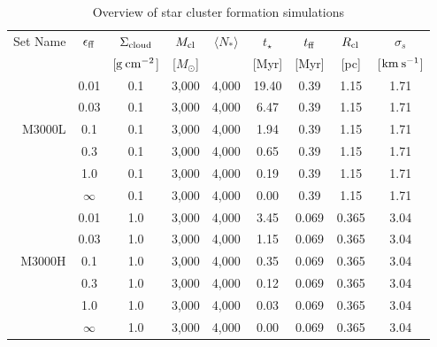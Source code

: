 \documentclass[fleqn,usenatbib]{mnras}
\newcommand\sfeff{\ensuremath{\epsilon_{\rm ff}}\xspace}   %
\newcommand\Sigmacloud{\ensuremath{\Sigma_{\rm cloud}}\xspace} %
\newcommand\Mcl{\ensuremath{M_{\rm cl}}\xspace} %
\begin{document}
\begin{table}
\centering
\caption{Overview of star cluster formation simulations}
\label{tab:simulations}
\begin{tabular}{rcccccccc}
Set Name & \sfeff & \Sigmacloud & \Mcl & $\langle N_* \rangle$ & $t_{\star}$ & $t_{\rm ff}$ & $R_{\rm cl}$ & $\sigma_{s}$\\ 
& & [$\rm g\:cm^{-2}$] & [$M_\odot$]  &   & [Myr] & [Myr] & [pc] & [$\rm km\: s^{-1}$] \\ \hline

  & 0.01 & 0.1 & 3,000  & 4,000  & 19.40 & 0.39  & 1.15 & 1.71 \\
  & 0.03 & 0.1 & 3,000  & 4,000  & 6.47  & 0.39  & 1.15 & 1.71 \\
M3000L  & 0.1  & 0.1 & 3,000  & 4,000  & 1.94  & 0.39  & 1.15 & 1.71 \\
  & 0.3  & 0.1 & 3,000  & 4,000  & 0.65  & 0.39  & 1.15 & 1.71 \\
  & 1.0  & 0.1 & 3,000  & 4,000  & 0.19  & 0.39  & 1.15 & 1.71 \\
  & $\infty$ & 0.1 & 3,000 & 4,000 & 0.00 &  0.39 & 1.15 & 1.71 \\ \cline{1-9}
 &  0.01 & 1.0 & 3,000  & 4,000  & 3.45  & 0.069  & 0.365 & 3.04 \\
 &  0.03 & 1.0 & 3,000  & 4,000  & 1.15  & 0.069  & 0.365 & 3.04 \\
M3000H &  0.1  & 1.0 & 3,000  & 4,000  & 0.35  & 0.069  & 0.365 & 3.04 \\
 &  0.3  & 1.0 & 3,000  & 4,000  & 0.12  & 0.069  & 0.365 & 3.04 \\
 &  1.0  & 1.0 & 3,000  & 4,000  & 0.03  & 0.069  & 0.365 & 3.04 \\
 & $\infty$ & 1.0 & 3,000 & 4,000 & 0.00 & 0.069 & 0.365 & 3.04 \\ \cline{1-9}
\end{tabular}
\end{table}
\end{document}
